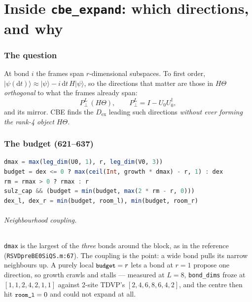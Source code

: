 \documentclass[11pt,a4paper]{article}
\newcommand{\code}[1]{\texttt{\small #1}}
\newcommand{\Dex}{D_{\mathrm{ex}}}
\newcommand{\Pperp}{P_{\perp}}
\newcommand{\dd}{\mathrm{d}}
\begin{document}
\part{Inside \code{cbe\_expand}: which directions, and why}
\label{part:cbe}

\section{The question}

At bond $i$ the frames span $r$-dimensional subspaces. To first order,
$|\psi(\dd t)\rangle \approx |\psi\rangle - i\,\dd t\,H|\psi\rangle$, so the directions that
matter are those in $H\Theta$ \emph{orthogonal} to what the frames already span:
\begin{equation}
  \Pperp^{L}\,(H\Theta),\qquad \Pperp^{L}=I-U_0U_0^\dagger,
  \label{eq:perp}
\end{equation}
and its mirror. CBE finds the $\Dex$ leading such directions \emph{without ever forming the
rank-4 object $H\Theta$}.

\section{The budget (621--637)}

\begin{lstlisting}[language=Julia,firstnumber=621]
dmax = max(leg_dim(U0, 1), r, leg_dim(V0, 3))
budget = dex <= 0 ? max(ceil(Int, growth * dmax) - r, 1) : dex
rm = rmax > 0 ? rmax : r
sulz_cap && (budget = min(budget, max(2 * rm - r, 0)))
dex_l, dex_r = min(budget, room_l), min(budget, room_r)
\end{lstlisting}

\paragraph{Neighbourhood coupling.} \code{dmax} is the largest of the \emph{three} bonds around
the block, as in the reference (\code{RSVDpreBE0SiQS.m:67}). The coupling is the point: a wide
bond pulls its narrow neighbours up. A purely local $\code{budget}=r$ lets a bond at $r=1$
propose one direction, so growth crawls and stalls --- measured at $L=8$, \code{bond\_dims}
froze at $[1,1,2,4,2,1,1]$ against 2-site TDVP's $[2,4,6,8,6,4,2]$, and the centre then hit
$\code{room\_l}=0$ and could not expand at all.
\end{document}

